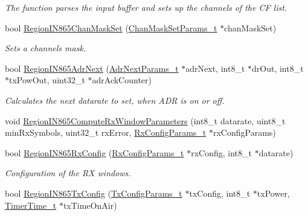\begin{DoxyCompactItemize}
\begin{DoxyCompactList}\small\item\em The function parses the input buffer and sets up the channels of the CF list. \end{DoxyCompactList}\item 
bool \mbox{\hyperlink{group___r_e_g_i_o_n_i_n865_ga9568fece1e2e7622c00229e0aae806e2}{Region\+I\+N865\+Chan\+Mask\+Set}} (\mbox{\hyperlink{group___r_e_g_i_o_n_ga6d24f7da136006410827dfb29f6b9b9e}{Chan\+Mask\+Set\+Params\+\_\+t}} $\ast$chan\+Mask\+Set)
\begin{DoxyCompactList}\small\item\em Sets a channels mask. \end{DoxyCompactList}\item 
bool \mbox{\hyperlink{group___r_e_g_i_o_n_i_n865_ga727c685b4ed8839cfcb83b2c3980f14c}{Region\+I\+N865\+Adr\+Next}} (\mbox{\hyperlink{group___r_e_g_i_o_n_ga567c2742622326b350b4e91bbf61b4ce}{Adr\+Next\+Params\+\_\+t}} $\ast$adr\+Next, int8\+\_\+t $\ast$dr\+Out, int8\+\_\+t $\ast$tx\+Pow\+Out, uint32\+\_\+t $\ast$adr\+Ack\+Counter)
\begin{DoxyCompactList}\small\item\em Calculates the next datarate to set, when A\+DR is on or off. \end{DoxyCompactList}\item 
void \mbox{\hyperlink{group___r_e_g_i_o_n_i_n865_ga66be427601e7105b522c36160c8513a7}{Region\+I\+N865\+Compute\+Rx\+Window\+Parameters}} (int8\+\_\+t datarate, uint8\+\_\+t min\+Rx\+Symbols, uint32\+\_\+t rx\+Error, \mbox{\hyperlink{group___r_e_g_i_o_n_ga375c038078dfcfc7ef14280021db719e}{Rx\+Config\+Params\+\_\+t}} $\ast$rx\+Config\+Params)
\item 
bool \mbox{\hyperlink{group___r_e_g_i_o_n_i_n865_ga2d222860d58d1d5175f0486b572870c5}{Region\+I\+N865\+Rx\+Config}} (\mbox{\hyperlink{group___r_e_g_i_o_n_ga375c038078dfcfc7ef14280021db719e}{Rx\+Config\+Params\+\_\+t}} $\ast$rx\+Config, int8\+\_\+t $\ast$datarate)
\begin{DoxyCompactList}\small\item\em Configuration of the RX windows. \end{DoxyCompactList}\item 
bool \mbox{\hyperlink{group___r_e_g_i_o_n_i_n865_gaab270c31d45ea8a203ca428e20de4988}{Region\+I\+N865\+Tx\+Config}} (\mbox{\hyperlink{group___r_e_g_i_o_n_gabed730d4d04b0b60d4b6d1966d3f21d3}{Tx\+Config\+Params\+\_\+t}} $\ast$tx\+Config, int8\+\_\+t $\ast$tx\+Power, \mbox{\hyperlink{utilities_8h_a4215ca43d3e953099ea758ce428599d0}{Timer\+Time\+\_\+t}} $\ast$tx\+Time\+On\+Air)

\end{DoxyCompactItemize}

